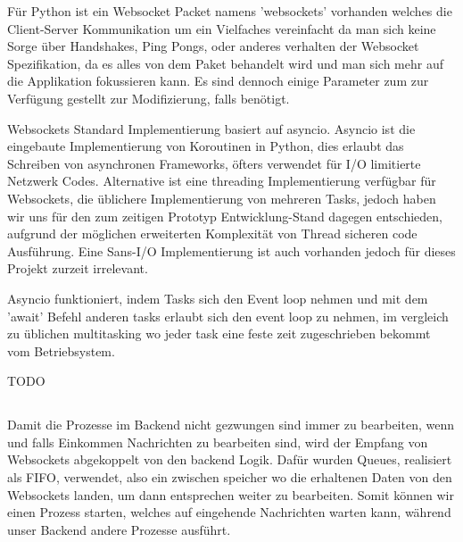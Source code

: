 Für Python ist ein Websocket Packet namens 'websockets' vorhanden welches die Client-Server Kommunikation
um ein Vielfaches vereinfacht da man sich keine Sorge über Handshakes, Ping Pongs, oder anderes verhalten
der Websocket Spezifikation, da es alles von dem Paket behandelt wird 
und man sich mehr auf die Applikation fokussieren kann. 
Es sind dennoch einige Parameter zum zur Verfügung gestellt zur Modifizierung, falls benötigt.

Websockets Standard Implementierung basiert auf asyncio.
%  
Asyncio ist die eingebaute Implementierung von Koroutinen in Python,
dies erlaubt das Schreiben von asynchronen Frameworks, 
öfters verwendet für I/O limitierte Netzwerk Codes.
Alternative ist eine threading Implementierung verfügbar für Websockets, 
die üblichere Implementierung von mehreren Tasks, 
jedoch haben wir uns für den zum zeitigen Prototyp Entwicklung-Stand dagegen entschieden,
aufgrund der möglichen erweiterten Komplexität von Thread sicheren code Ausführung.
Eine Sans-I/O Implementierung ist auch vorhanden jedoch für dieses Projekt zurzeit irrelevant.



Asyncio funktioniert, indem Tasks sich den Event loop nehmen und mit dem 'await' 
Befehl anderen tasks erlaubt sich den event loop zu nehmen, im vergleich zu üblichen multitasking
wo jeder task eine feste zeit zugeschrieben bekommt vom Betriebsystem.

TODO

\subsection{}

Damit die Prozesse im Backend nicht gezwungen sind immer zu bearbeiten, 
wenn und falls Einkommen Nachrichten zu bearbeiten sind, 
wird der Empfang von Websockets abgekoppelt von den backend Logik.
Dafür wurden Queues, realisiert als FIFO, verwendet, also ein zwischen speicher 
wo die erhaltenen Daten von den Websockets landen, um dann entsprechen weiter zu bearbeiten.
Somit können wir einen Prozess starten, welches auf eingehende Nachrichten warten kann, 
während unser Backend andere Prozesse ausführt.

